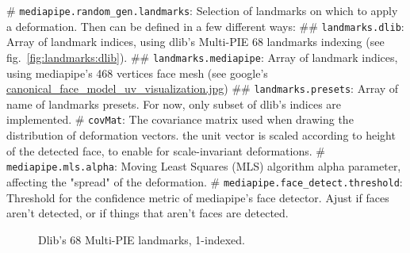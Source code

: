 \documentclass[oneside,10pt]{article}
\begin{document}
\vspace{10pt}
\begin{easylist}[itemize]
# \texttt{mediapipe.random\_gen.landmarks}: Selection of landmarks on which to
        apply a deformation. Then can be defined in a few different ways:
## \texttt{landmarks.dlib}: Array of landmark indices, using dlib's Multi-PIE
        68 landmarks indexing (see fig.~\ref{fig:landmarks:dlib}).
## \texttt{landmarks.mediapipe}: Array of landmark indices, using mediapipe's 468
        vertices face mesh (see google's
        \href{https://github.com/google/mediapipe/blob/master/mediapipe/modules/face_geometry/data/canonical_face_model_uv_visualization.png}{canonical\_face\_model\_uv\_visualization.jpg})
## \texttt{landmarks.presets}: Array of name of landmarks presets. For now,
        only subset of dlib's indices are implemented.
# \texttt{covMat}: The covariance matrix used when drawing the distribution of
        deformation vectors. the unit vector is scaled according to height of
        the detected face, to enable for scale-invariant deformations.
# \texttt{mediapipe.mls.alpha}: Moving Least Squares (MLS) algorithm
        alpha parameter, affecting the "spread" of the deformation.
# \texttt{mediapipe.face\_detect.threshold}: Threshold for the confidence
        metric of mediapipe's face detector. Ajust if faces aren't detected, or
        if things that aren't faces are detected.
\end{easylist}
\vspace{8pt}

\begin{figure}[ht!]
\center
{}
\caption{Dlib's 68 Multi-PIE landmarks, 1-indexed.}
\label{fig:voronoi}
\end{figure}



\end{document}
